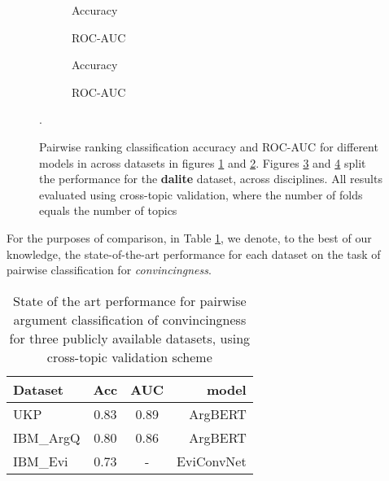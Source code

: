 \documentclass[runningheads]{llncs}
\begin{document}
\begin{figure}
	\begin{subfigure}[t]{0.5\linewidth}
		\centering
		\scalebox{0.4}{}
		\caption{Accuracy}
		\label{fig:acc_cross_topic}
	\end{subfigure}%
	\qquad
	\begin{subfigure}[t]{0.5\linewidth}
		\centering
		\scalebox{0.4}{}
		\caption{ROC-AUC}
		\label{fig:AUC_cross_topic}
	\end{subfigure}
	\begin{subfigure}[t]{0.5\linewidth}
		\centering
		\scalebox{0.4}{}
		\caption{Accuracy}
		\label{fig:acc_dalite_cross_topic}
	\end{subfigure}%
	\qquad
	\begin{subfigure}[t]{0.5\linewidth}
		\centering
		\scalebox{0.4}{}
		\caption{ROC-AUC}
		\label{fig:AUC_dalite_cross_topic}
	\end{subfigure}
	\caption{Pairwise ranking classification accuracy and ROC-AUC for 
		different models in across datasets in figures 
		\ref{fig:acc_cross_topic} 
		and \ref{fig:AUC_cross_topic}. Figures \ref{fig:acc_dalite_cross_topic} 
		and 
		\ref{fig:AUC_dalite_cross_topic} split the performance for the 
		\textbf{dalite} dataset, across disciplines. All results evaluated 
		using 
		cross-topic validation, where the number of folds equals the number of 
		topics}.
	\label{fig:performance_cross_topic}
	
\end{figure}


For the purposes of comparison, in Table \ref{tab:sota}, we denote, to the best 
of our knowledge, the state-of-the-art performance for each dataset on the task 
of pairwise  classification for \textit{convincingness}. 

\begin{table} 
	\caption{State of the art performance for pairwise argument classification 
	of 
	convincingness for three publicly available datasets, using cross-topic 
	validation scheme}
\label{tab:sota}
	\centering\begin{tabular}{l|*{2}{c}r}
		Dataset     & Acc & AUC & model  	   \\
		\hline
		UKP 		& 0.83 & 0.89 & ArgBERT\cite{toledo_automatic_2019}    \\
		IBM\_ArgQ   & 0.80 & 0.86 & ArgBERT\cite{toledo_automatic_2019}    \\
		IBM\_Evi    & 0.73 & - 	  & EviConvNet\cite{gleize_are_2019} \\
	\end{tabular}
\end{table}
\end{document}
